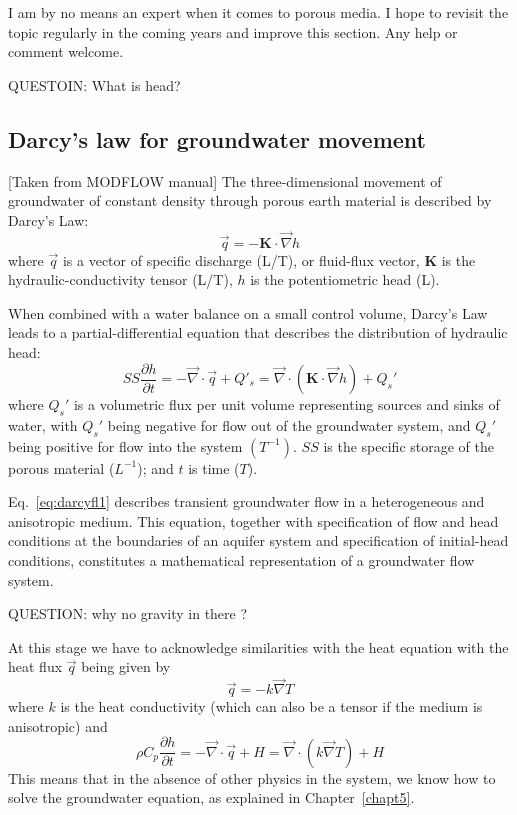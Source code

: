 
{\color{orange} I am by no means an expert when it comes to porous media. I hope to revisit the topic regularly in the coming years and improve this section. Any help or comment welcome.}


QUESTOIN: What is head? 

\subsection{Darcy's law for groundwater movement}

[Taken from MODFLOW manual]
The three-dimensional movement of groundwater of constant density through porous earth material is
described by Darcy's Law:
\[
\vec{q} = - {\bm K}\cdot \vec\nabla h
\]
where $\vec{q}$ is a vector of specific discharge (L/T), or fluid-flux vector,
${\bm K}$ is the hydraulic-conductivity tensor (L/T),
$h$ is the potentiometric head (L).

When combined with a water balance on a small control volume, Darcy's
Law leads to a partial-differential equation that describes the distribution of hydraulic head:
\begin{equation}
SS \frac{\partial h}{\partial t} = - \vec\nabla\cdot \vec{q} + Q'_s = \vec\nabla \cdot ({\bm K} \cdot \vec\nabla h) + Q_s'
\label{eq:darcyfl1}
\end{equation}
where $Q_s'$ is a volumetric flux per unit volume representing sources and sinks of water, with $Q_s'$ 
being negative for flow out of the groundwater system, and $Q_s'$ being positive for flow into the system $(T^{-1})$.
$SS$ is the specific storage of the porous material ($L^{-1}$); and $t$ is time ($T$).

Eq.~\eqref{eq:darcyfl1} describes transient groundwater flow in a 
heterogeneous and anisotropic medium. This equation, together with specification of flow and head conditions
at the boundaries of an aquifer system and specification of initial-head conditions, constitutes a mathematical
representation of a groundwater flow system.

QUESTION: why no gravity in there ?



At this stage we have to acknowledge similarities with the heat equation
with the heat flux $\vec{q}$ being given by
\[
\vec{q} = - k \vec\nabla T
\]
where $k$ is the heat conductivity (which can also be a tensor if the medium is anisotropic)
and 
\[
\rho C_p \frac{\partial h}{\partial t} = - \vec\nabla\cdot \vec{q} + H = \vec\nabla \cdot (k\vec\nabla T )+ H 
\]
This means that in the absence of other physics in the system, we know how to solve the groundwater equation,
as explained in Chapter~\ref{chapt5}.



